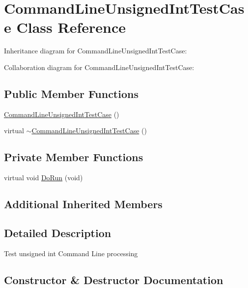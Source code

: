 \hypertarget{classCommandLineUnsignedIntTestCase}{}\section{Command\+Line\+Unsigned\+Int\+Test\+Case Class Reference}
\label{classCommandLineUnsignedIntTestCase}


Inheritance diagram for Command\+Line\+Unsigned\+Int\+Test\+Case\+:


Collaboration diagram for Command\+Line\+Unsigned\+Int\+Test\+Case\+:
\subsection*{Public Member Functions}
\begin{DoxyCompactItemize}
\item 
\hyperlink{classCommandLineUnsignedIntTestCase_a15ca78e1313d0691f18a43a56822126c}{Command\+Line\+Unsigned\+Int\+Test\+Case} ()
\item 
virtual \hyperlink{classCommandLineUnsignedIntTestCase_a7b023893e0e9b609fecc0a0401839679}{$\sim$\+Command\+Line\+Unsigned\+Int\+Test\+Case} ()
\end{DoxyCompactItemize}
\subsection*{Private Member Functions}
\begin{DoxyCompactItemize}
\item 
virtual void \hyperlink{classCommandLineUnsignedIntTestCase_aa8db209759d5df79d6955b2e68006865}{Do\+Run} (void)
\end{DoxyCompactItemize}
\subsection*{Additional Inherited Members}


\subsection{Detailed Description}
Test unsigned int Command Line processing 

\subsection{Constructor \& Destructor Documentation}
